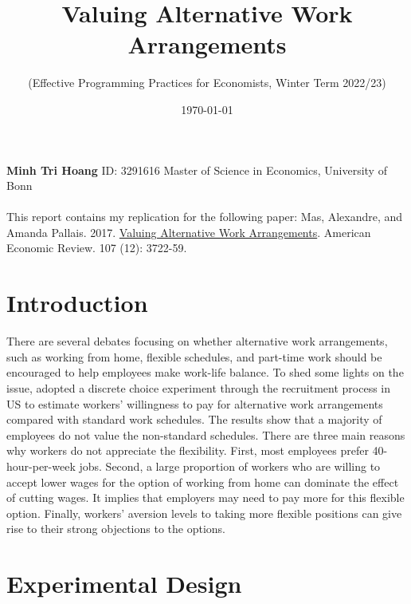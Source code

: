 \documentclass[11pt]{article}
\begin{document}
\title{\textbf{Valuing Alternative Work Arrangements}}
\author{(Effective Programming Practices for Economists, Winter Term 2022/23)}
\date{\today}

\maketitle
\textbf{Minh Tri Hoang} \textbar{} ID: 3291616 \textbar{} Master of Science in Economics, University of Bonn \\ \\
This report contains my replication for the following paper: Mas, Alexandre, and Amanda Pallais. 2017. \href{https://www.aeaweb.org/articles?id=10.1257/aer.20161500}{Valuing Alternative Work Arrangements}. American Economic Review. 107 (12): 3722-59.

\tableofcontents

\hypertarget{introduction}{%
\section{Introduction}\label{introduction}}

There are several debates focusing on whether alternative work arrangements, such as working from home, flexible schedules, and part-time work should be encouraged to help employees make work-life balance. To shed some lights on the issue, \cite{10.1257/aer.20161500} adopted a discrete choice experiment through the recruitment process in US to estimate workers' willingness to pay for alternative work arrangements compared with standard work schedules. The results show that a majority of employees do not value the non-standard schedules. There are three main reasons why workers do not appreciate the flexibility. First, most employees prefer 40-hour-per-week jobs. Second, a large proportion of workers who are willing to accept lower wages for the option of working from home can dominate the effect of cutting wages. It implies that employers may need to pay more for this flexible option. Finally, workers' aversion levels to taking more flexible positions can give rise to their strong objections to the options.

\hypertarget{Experimental Design}{%
\section{Experimental Design}\label{Experimental Design}}
\end{document}

